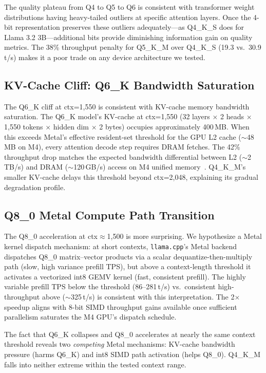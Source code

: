 \documentclass{article}
\begin{document}
The quality plateau from Q4 to Q5 to Q6 is consistent with transformer weight distributions having heavy-tailed outliers at specific attention layers. Once the 4-bit representation preserves these outliers adequately—as Q4\_K\_S does for Llama 3.2 3B—additional bits provide diminishing information gain on quality metrics. The 38\% throughput penalty for Q5\_K\_M over Q4\_K\_S (19.3 vs.\ 30.9\,t/s) makes it a poor trade on any device architecture we tested.

\subsection{KV-Cache Cliff: Q6\_K Bandwidth Saturation}

The Q6\_K cliff at ctx=1,550 is consistent with KV-cache memory bandwidth saturation. The Q6\_K model's KV-cache at ctx=1,550 (32 layers $\times$ 2 heads $\times$ 1,550 tokens $\times$ hidden dim $\times$ 2 bytes) occupies approximately 400\,MB. When this exceeds Metal's effective resident-set threshold for the GPU L2 cache ($\sim$48\,MB on M4), every attention decode step requires DRAM fetches. The 42\% throughput drop matches the expected bandwidth differential between L2 ($\sim$2\,TB/s) and DRAM ($\sim$120\,GB/s) access on M4 unified memory~\cite{applem4}. Q4\_K\_M's smaller KV-cache delays this threshold beyond ctx=2,048, explaining its gradual degradation profile.

\subsection{Q8\_0 Metal Compute Path Transition}

The Q8\_0 acceleration at ctx$\approx$1,500 is more surprising. We hypothesize a Metal kernel dispatch mechanism: at short contexts, \texttt{llama.cpp}'s Metal backend dispatches Q8\_0 matrix--vector products via a scalar dequantize-then-multiply path (slow, high variance prefill TPS), but above a context-length threshold it activates a vectorized int8 GEMV kernel (fast, consistent prefill). The highly variable prefill TPS below the threshold (86--281\,t/s) vs.\ consistent high-throughput above ($\sim$325\,t/s) is consistent with this interpretation. The 2$\times$ speedup aligns with 8-bit SIMD throughput gains available once sufficient parallelism saturates the M4 GPU's dispatch schedule.

The fact that Q6\_K collapses and Q8\_0 accelerates at nearly the same context threshold reveals two \emph{competing} Metal mechanisms: KV-cache bandwidth pressure (harms Q6\_K) and int8 SIMD path activation (helps Q8\_0). Q4\_K\_M falls into neither extreme within the tested context range.
\end{document}
